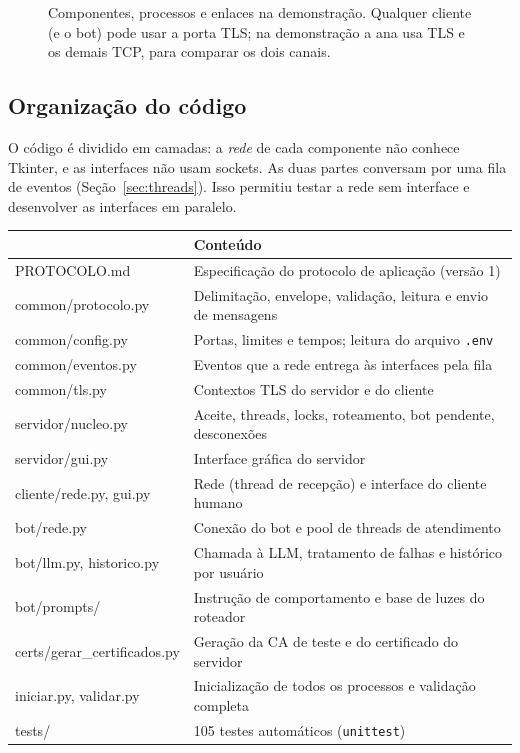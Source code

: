 \documentclass[11pt,a4paper]{article}
\newcommand{\cod}[1]{\texttt{#1}}
\begin{document}
\begin{figure}[H]
\caption{Componentes, processos e enlaces na demonstração. Qualquer cliente (e o bot) pode
usar a porta TLS; na demonstração a ana usa TLS e os demais TCP, para comparar os dois canais.}
\label{fig:arquitetura}
\end{figure}

\subsection{Organização do código}
O código é dividido em camadas: a \emph{rede} de cada componente não conhece Tkinter, e as interfaces
não usam sockets. As duas partes conversam por uma fila de eventos
(Seção~\ref{sec:threads}). Isso permitiu testar a rede sem interface e desenvolver as interfaces
em paralelo.

\begin{center}
\small
\begin{tabularx}{\linewidth}{>{\ttfamily}l X}
\toprule
{\normalfont\bfseries Arquivo} & \textbf{Conteúdo} \\
\midrule
PROTOCOLO.md           & Especificação do protocolo de aplicação (versão 1) \\
common/protocolo.py    & Delimitação, envelope, validação, leitura e envio de mensagens \\
common/config.py       & Portas, limites e tempos; leitura do arquivo \cod{.env} \\
common/eventos.py      & Eventos que a rede entrega às interfaces pela fila \\
common/tls.py          & Contextos TLS do servidor e do cliente \\
servidor/nucleo.py     & Aceite, threads, locks, roteamento, bot pendente, desconexões \\
servidor/gui.py        & Interface gráfica do servidor \\
cliente/rede.py, gui.py & Rede (thread de recepção) e interface do cliente humano \\
bot/rede.py            & Conexão do bot e pool de threads de atendimento \\
bot/llm.py, historico.py & Chamada à LLM, tratamento de falhas e histórico por usuário \\
bot/prompts/           & Instrução de comportamento e base de luzes do roteador \\
certs/gerar\_certificados.py & Geração da CA de teste e do certificado do servidor \\
iniciar.py, validar.py & Inicialização de todos os processos e validação completa \\
tests/                 & 105 testes automáticos (\cod{unittest}) \\
\bottomrule
\end{tabularx}
\end{center}
\end{document}
